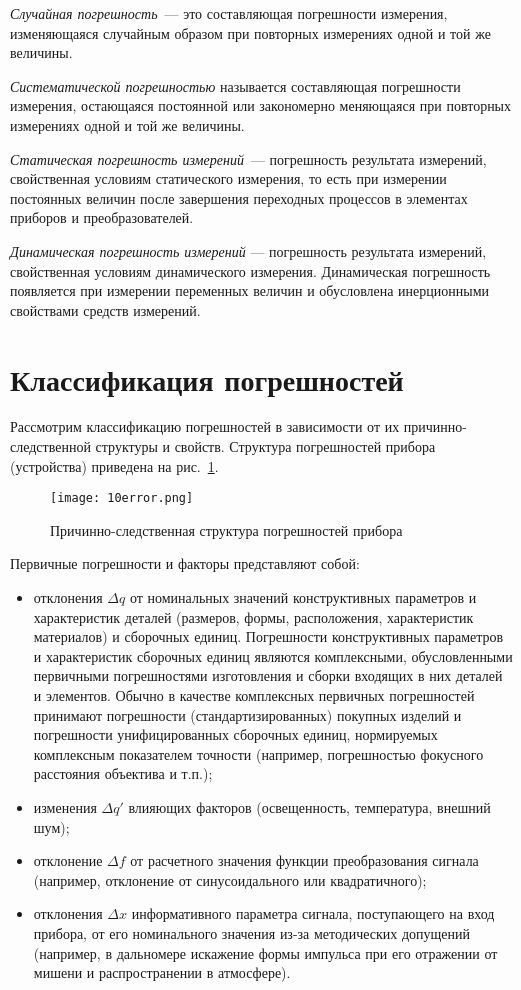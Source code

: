 \textit{Случайная погрешность}~--– это составляющая погрешности измерения, изменяющаяся случайным образом при повторных измерениях одной и той же величины. 

\textit{Систематической погрешностью} называется составляющая погрешности измерения, остающаяся постоянной или закономерно меняющаяся при повторных измерениях одной и той же величины.

\textit{Статическая погрешность измерений}~--- погрешность результата измерений, свойственная условиям статического измерения, то есть при измерении постоянных величин после завершения переходных процессов в элементах приборов и преобразователей. 

\textit{Динамическая погрешность измерений} --- погрешность результата измерений, свойственная условиям динамического измерения. Динамическая погрешность появляется при измерении переменных величин и обусловлена инерционными свойствами средств измерений.

\section{Классификация погрешностей}

Рассмотрим классификацию погрешностей в зависимости от их причинно-следственной структуры и свойств. Структура погрешностей прибора (устройства) приведена на рис.~\ref{pic:10error}.

\begin{figure}[h!]
	\caption{ Причинно-следственная структура погрешностей прибора }
	\texttt{[image: 10error.png]}
	\label{pic:10error}
\end{figure}

Первичные погрешности и факторы представляют собой: 
\begin{itemize}
\item отклонения $ \Delta q $ от номинальных значений конструктивных параметров и характеристик деталей (размеров, формы, расположения, характеристик материалов) и сборочных единиц. Погрешности конструктивных параметров и характеристик сборочных единиц являются комплексными, обусловленными первичными погрешностями изготовления и сборки входящих в них деталей и элементов. Обычно в качестве комплексных первичных погрешностей принимают погрешности (стандартизированных) покупных изделий и погрешности унифицированных сборочных единиц, нормируемых комплексным показателем точности (например, погрешностью фокусного расстояния объектива и т.п.);
\item изменения $ \Delta q' $ влияющих факторов (освещенность, температура, внешний шум);
\item отклонение $ \Delta f $ от расчетного значения функции преобразования сигнала (например, отклонение от синусоидального или квадратичного);
\item отклонения $ \Delta x $ информативного параметра сигнала, поступающего на вход прибора, от его номинального значения  из-за методических допущений (например, в дальномере искажение формы импульса при его отражении от мишени и распространении в атмосфере).
\end{itemize}

